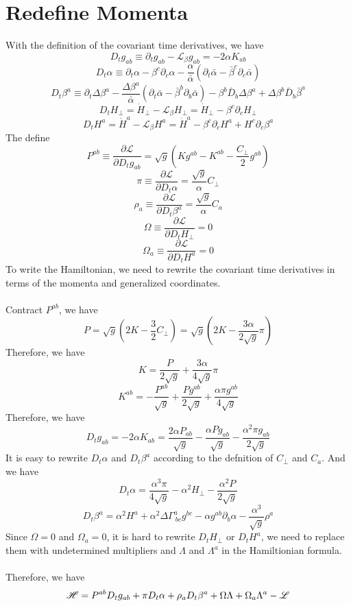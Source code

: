\documentclass{article}
\begin{document}
\section{Redefine Momenta}
With the definition of the covariant time derivatives, we have
\[
D_{t}g_{ab} \equiv \partial_{t}g_{ab} - \mathscr{L}_{\beta} g_{ab} = -2\alpha K_{ab}
\] 
\[
D_{t}\alpha \equiv  \partial_{t}\alpha - \beta^{c}\partial_{c}\alpha - \frac{\alpha}{{\bar \alpha}}\left(\partial_{t}{\bar \alpha} - {\bar \beta}^{c}\partial_{c}{\bar \alpha}\right)
\]
\[
D_{t}\beta^{a} \equiv \partial_{t}\Delta \beta^{a} - \frac{\Delta \beta^{a}}{{\bar \alpha}}\left(\partial_{t}{\bar \alpha} - {\bar \beta}^{b}\partial_{b}{\bar \alpha}\right) - \beta^{b}{\bar D}_{b}\Delta \beta^{a} + \Delta \beta^{b}{\bar D}_{b}{\bar \beta}^{a}
\]
\[
D_{t}H_{\perp} = {\dot H}_{\perp} - \mathscr{L}_{\beta}H_{\perp} = {\dot H}_{\perp} - \beta^{c}\partial_{c}H_{\perp}
\]
\[
D_{t}H^{a} = {\dot H}^{a} - \mathscr{L}_{\beta}H^{a} = {\dot H}^{a} - \beta^{c}\partial_{c}H^{a} + H^{c}\partial_{c}\beta^{a}
\]
The define
\[
P^{ab} \equiv \frac{\partial \mathscr{L}}{\partial D_{t}g_{ab}} = \sqrt{g}(Kg^{ab} - K^{ab} - \frac{C_{\perp}}{2}g^{ab})
\]
\[
\pi \equiv \frac{\partial \mathscr{L}}{\partial D_{t}\alpha} = \frac{\sqrt{g}}{\alpha}C_{\perp}
\]
\[
\rho_{a} \equiv \frac{\partial \mathscr{L}}{\partial D_{t}\beta^{a}} = \frac{\sqrt{g}}{\alpha}C_{a}
\]
\[
\Omega \equiv \frac{\partial \mathscr{L}}{\partial D_{t} H_{\perp}} = 0
\]
\[
\Omega_{a} \equiv \frac{\partial \mathscr{L}}{\partial D_{t} H^{a}} = 0
\]
To write the Hamiltonian, we need to rewrite the covariant time derivatives in terms of the momenta and generalized coordinates. 
\\
\\
Contract $P^{ab}$, we have
\[
P = \sqrt{g}(2K - \frac{3}{2}C_{\perp}) = \sqrt{g}(2K - \frac{3\alpha}{2\sqrt{g}}\pi)
\]
Therefore, we have
\[
\boxed{K = \frac{P}{2\sqrt{g}} + \frac{3\alpha}{4\sqrt{g}}\pi}
\]
\[
\boxed{
K^{ab} = -\frac{P^{ab}}{\sqrt{g}} + \frac{Pg^{ab}}{2\sqrt{g}} + \frac{\alpha \pi g^{ab}}{4\sqrt{g}}
}
\]
Therefore, we have
\[
\boxed{
D_{t}g_{ab} = -2\alpha K_{ab} = \frac{2\alpha P_{ab}}{\sqrt{g}} - \frac{\alpha P g_{ab}}{\sqrt{g}} - \frac{\alpha^{2}\pi g_{ab}}{2\sqrt{g}}
}
\]
It is easy to rewrite $D_{t}\alpha$ and $D_{t}\beta^{a}$ according to the defnition of $C_{\perp}$ and $C_{a}$. And we have
\[
\boxed{
D_{t}\alpha = \frac{\alpha^{3}\pi}{4\sqrt{g}} - \alpha^{2}H_{\perp} - \frac{\alpha^{2}P}{2\sqrt{g}}
}
\]
\[
\boxed{
D_{t}\beta^{a} = \alpha^{2}H^{a} + \alpha^{2}\Delta \Gamma^{a}_{~bc}g^{bc} - \alpha g^{ab}\partial_{b}\alpha - \frac{\alpha^{3}}{\sqrt{g}}\rho^{a}
}
\]
Since $\Omega = 0$ and $\Omega_{a} = 0$, it is hard to rewrite $D_{t} H_{\perp}$ or $D_{t} H^{a}$, we need to replace them with undetermined multipliers and $\Lambda$ and $\Lambda^{a}$ in the Hamiltionian formula. \\
\\
Therefore, we have
\[
\mathscr{H}  = P^{ab}D_{t}g_{ab} + \pi D_{t}\alpha + \rho_{a}D_{t}\beta^{a} + \Omega\Lambda + \Omega_{a}\Lambda^{a} - \mathscr{L}\\
\]
\end{document}

